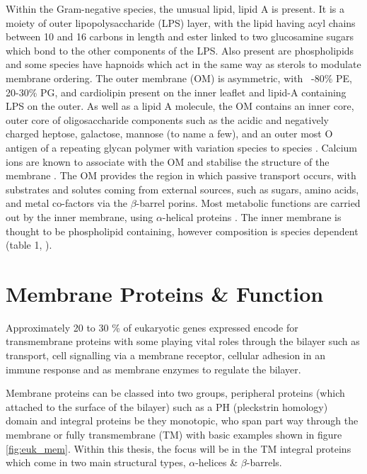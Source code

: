 Within the Gram-negative species, the unusual lipid, lipid A is present. It is a moiety of outer lipopolysaccharide (LPS) layer, with the lipid having  acyl chains between 10 and 16 carbons in length \cite{Sohlenkamp2015} and ester linked to two glucosamine sugars which bond to the other components of the LPS. Also present are phospholipids and some species have hapnoids which act in the same way as sterols to modulate membrane ordering. The outer membrane (OM) is asymmetric, with ~-80\% PE, 20-30\% PG, and cardiolipin present on the inner leaflet and lipid-A containing LPS on the outer. As well as a lipid A molecule,  the OM contains an inner core, outer core of oligosaccharide components such as the acidic and negatively charged heptose, galactose, mannose (to name a few), and an outer most O antigen of a repeating glycan polymer with variation species to species \cite{Sperandeo2009}. Calcium ions are known to associate with the OM and stabilise the structure of the membrane \cite{Ferrero2007}. The OM provides the region in which passive transport occurs, with substrates and solutes coming from external sources, such as sugars, amino acids, and metal co-factors via the $\beta$-barrel porins. Most metabolic functions are carried out by the inner membrane, using $\alpha$-helical proteins \cite{Tamm2001}. The inner membrane is thought to be phospholipid containing, however composition is species dependent (table 1, \cite{Saenz2012}).


\section{Membrane Proteins \& Function}

Approximately 20 to 30 \% of eukaryotic genes expressed encode for transmembrane proteins \cite{Krogh2001} with some playing vital roles through the bilayer such as transport, cell signalling via a membrane receptor, cellular adhesion in an immune response and as membrane enzymes to regulate the bilayer.  

Membrane proteins can be classed into two groups, peripheral proteins (which attached to the surface of the bilayer) such as a PH (pleckstrin homology) domain and integral proteins be they monotopic, who span part way through the membrane or fully transmembrane (TM) with basic examples shown in figure \ref{fig:euk_mem}. Within this thesis, the focus will be in the TM integral proteins which come in two main structural types, $\alpha$-helices \& $\beta$-barrels. 

